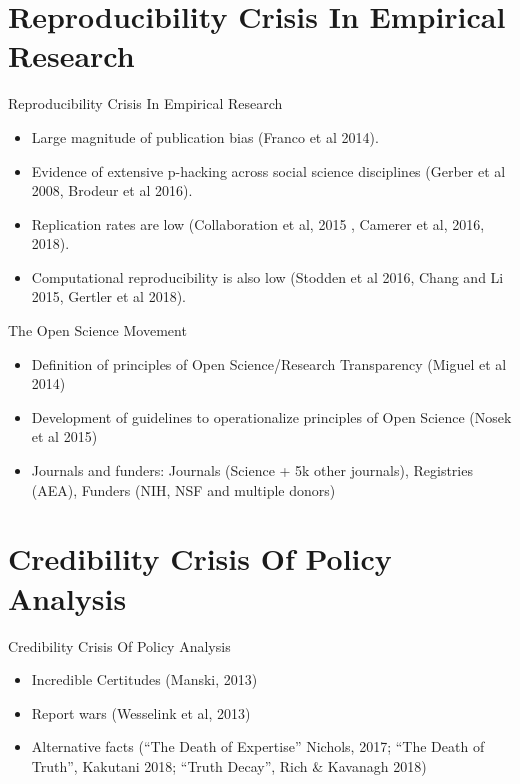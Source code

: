 \documentclass{beamer}
\begin{document}
\section[Crisis in Research]{Reproducibility Crisis In Empirical Research}

\begin{frame}{Reproducibility Crisis In Empirical Research}

\begin{itemize}
\item Large magnitude of publication bias (Franco et al 2014).  
\item Evidence of extensive p-hacking across social science disciplines (Gerber et al 2008, Brodeur et al 2016).
\item Replication rates are low (Collaboration et al, 2015 , Camerer et al, 2016, 2018). 
\item Computational reproducibility is also low (Stodden et al 2016, Chang and Li 2015, Gertler et al 2018).
\end{itemize}

\end{frame} 


\begin{frame}{The Open Science Movement}

\begin{itemize}
\item Definition of principles of Open Science/Research Transparency (Miguel et al 2014)
\item Development of guidelines to operationalize principles of Open Science (Nosek et al 2015)
\item Journals and funders: Journals (Science + 5k other journals), Registries (AEA), Funders (NIH, NSF and multiple donors)
\end{itemize}

\end{frame} 

\section[Crisis in PA]{Credibility Crisis Of Policy Analysis}

\begin{frame}{Credibility Crisis Of Policy Analysis}
\begin{itemize}
\item Incredible Certitudes  (Manski, 2013) 
\item Report wars (Wesselink et al, 2013) 
\pause
\item Alternative facts (``The Death of Expertise'' Nichols, 2017; ``The Death of Truth'', Kakutani 2018; ``Truth Decay'', Rich \& Kavanagh 2018)
\end{itemize}
\end{frame} 
\end{document}
